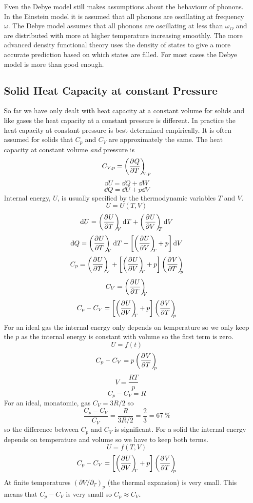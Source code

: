     Even the Debye model still makes assumptions about the behaviour of phonons.
    In the Einstein model it is assumed that all phonons are oscillating at  frequency \(\omega\).
    The Debye model assumes that all phonons are oscillating at less than \(\omega_D\) and are distributed with more at higher temperature increasing smoothly.
    The more advanced density functional theory uses the density of states to give a more accurate prediction based on which states are filled.
    For most cases the Debye model is more than good enough.
    
    \subsection{Solid Heat Capacity at constant Pressure}
    So far we have only dealt with heat capacity at a constant volume for solids and like gases the heat capacity at a constant pressure is different.
    In practice  the heat capacity at constant pressure is best determined empirically.
    It is often assumed for solids that \(C_p\) and \(C_V\) are approximately the same.
    The heat capacity at constant volume \emph{and} pressure is
    \[C_{V,p} = \left(\pdv[]{Q}{T}\right)_{\!\!\!{V,p}}\]
    \[\dd U = \dd Q + \dd W\]
    \[\dd Q = \dd U + p\dd V\]
    Internal energy, \(U\), is usually specified by the thermodynamic variables \(T\) and \(V\).
    \[U = U(T, V)\]
    \[\dd U = \left(\pdv[]{U}{T}\right)_{\!\!\!{V}}\dd T + \left(\pdv[]{U}{V}\right)_{\!\!\!{T}}\dd V\]
    \[\dd Q = \left(\pdv[]{U}{T}\right)_{\!\!\!{V}}\dd T + \left[\left(\pdv[]{U}{V}\right)_{\!\!\!{T}} + p\right]\dd V\]
    \[C_p = \pdvconst{U}{T}{V} + \left[\pdvconst{U}{V}{T} + p\right]\pdvconst{V}{T}{p}\]
    \[C_V = \left(\pdv[]{U}{T}\right)_{\!\!\!{V}}\]
    \[C_p - C_V = \left[\left(\pdv[]{U}{V}\right)_{\!\!\!{T}} + p\right]\left(\pdv[]{V}{T}\right)_{\!\!\!{p}}\]
    For an ideal gas the internal energy only depends on  temperature so we only keep the \(p\) as the internal energy is constant with volume so the first term is zero.
    \[U = f(t)\]
    \[C_p - C_V = p\left(\pdv[]{V}{T}\right)_{\!\!\!{p}}\]
    \[V = \frac{RT}{p}\]
    \[C_p - C_V = R\]
    For an ideal, monatomic, gas \(C_V = 3R/2\) so
    \[\frac{C_p - C_V}{C_V} = \frac{R}{3R/2} = \frac{2}{3} = \SI{67}{\%}\]
    so the difference between \(C_p\) and \(C_V\) is significant.
    For a solid the internal energy depends on temperature and volume so we have to keep both terms.
    \[U = f(T, V)\]
    \[C_p - C_V = \left[\left(\pdv[]{U}{V}\right)_{\!\!\!{T}} + p\right]\left(\pdv[]{V}{T}\right)_{\!\!\!{p}}\]
    At finite temperatures \((\partial V/\partial_T)_p\) (the thermal expansion) is very small.
    This means that \(C_p - C_V\) is very small so \(C_p\approx C_V\).
    
